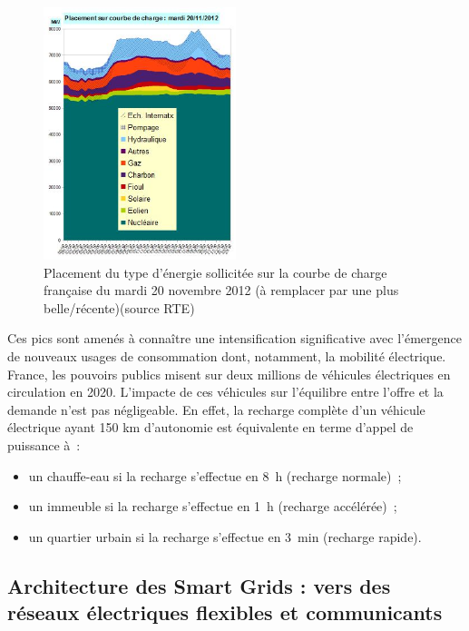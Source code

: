 \begin{figure}[!htbp]
 \begin{center}
  \includegraphics[width=0.5\textwidth]{images/problematique/ccharge.jpg}
 \end{center}
 \caption{Placement du type d'énergie sollicitée sur la courbe de charge française du mardi 20 novembre 2012 (à remplacer par une plus belle/récente)(source RTE)}
 \label{fig:courbeCharge}
\end{figure}

Ces pics sont amenés à connaître une intensification significative avec l'émergence de nouveaux usages de consommation dont, notamment, la mobilité électrique. France, les pouvoirs publics misent sur deux millions de véhicules électriques en circulation en 2020. L'impacte de ces véhicules sur l'équilibre entre l'offre et la demande n'est pas négligeable. En effet, la recharge complète d'un véhicule électrique ayant 150 km d'autonomie est équivalente en terme d'appel de puissance à~:
\begin{itemize}
\item un chauffe-eau si la recharge s'effectue en 8~h (recharge normale)~;
\item un immeuble si la recharge s'effectue en 1~h (recharge accélérée)~;
\item un quartier urbain si la recharge s'effectue en 3~min (recharge rapide).
\end{itemize}



\subsection{Architecture des Smart Grids : vers des réseaux électriques flexibles et communicants}

